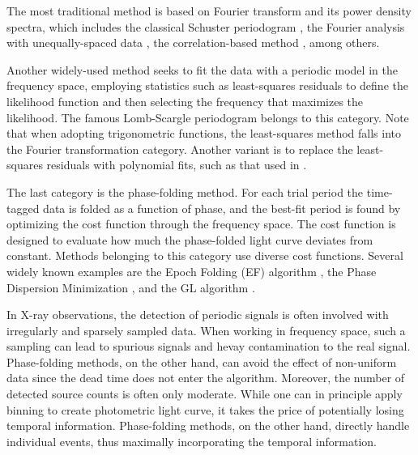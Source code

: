 \documentclass[fleqn,usenatbib]{mnras}
\begin{document}
The most traditional method is based on Fourier transform and its power density spectra, which includes the classical Schuster periodogram \citep{1898TeMag...3...13S}, the Fourier analysis with unequally-spaced data \citep{1975Ap&SS..36..137D}, the correlation-based method \citep{1988ApJ...333..646E}, among others.

Another widely-used method seeks to fit the data with a periodic model in the frequency space, employing statistics such as least-squares residuals to define the likelihood function and then selecting the frequency that maximizes the likelihood. The famous Lomb-Scargle periodogram \citep[hereafter LS]{1976Ap&SS..39..447L,1982ApJ...263..835S} belongs to this category. Note that when adopting trigonometric functions, the least-squares method falls into the Fourier transformation category. Another variant is to replace the least-squares residuals with polynomial fits, such as that used in \citet{1996ApJ...460L.107S}.

The last category is the phase-folding method. For each trial period the time-tagged data is folded as a function of phase, and the best-fit period is found by optimizing the cost function through the frequency space. The cost function is designed to evaluate how much the phase-folded light curve deviates from constant.
Methods belonging to this category use diverse cost functions. Several widely known examples are the Epoch Folding (EF) algorithm \citep{1983ApJ...266..160L}, the Phase Dispersion Minimization \citep{1978ApJ...224..953S}, and the GL algorithm \citep{1992ApJ...398..146G}.

In X-ray observations, the detection of periodic signals is often involved with irregularly and sparsely sampled data. 
When working in frequency space, such a sampling can lead to spurious signals and hevay contamination to the real signal. Phase-folding methods, on the other hand, can avoid the effect of non-uniform data since the dead time does not enter the algorithm.
Moreover, the number of detected source counts is often only moderate. While one can in principle apply binning to create photometric light curve, it takes the price of potentially losing temporal information. Phase-folding methods, on the other hand, directly handle individual events, thus maximally incorporating the temporal information.
\end{document}
